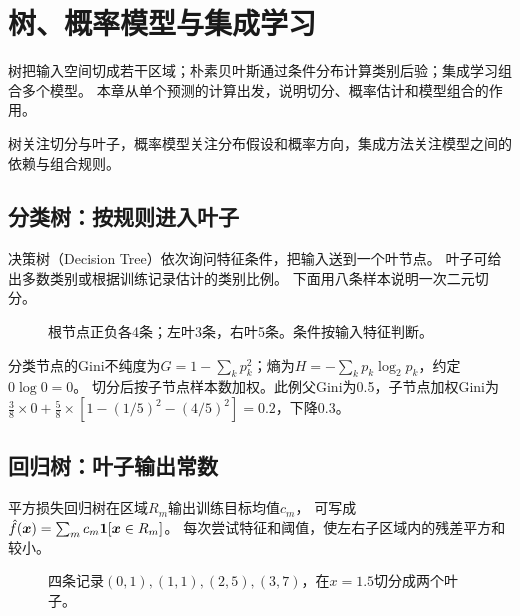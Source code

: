 \chapter{树、概率模型与集成学习}
\label{ch:trees}

树把输入空间切成若干区域；朴素贝叶斯通过条件分布计算类别后验；集成学习组合多个模型。
本章从单个预测的计算出发，说明切分、概率估计和模型组合的作用。

\begin{keyidea}[预测结构决定了检查重点]
树关注切分与叶子，概率模型关注分布假设和概率方向，集成方法关注模型之间的依赖与组合规则。
\end{keyidea}

\section{分类树：按规则进入叶子}
\label{sec:tree-classification}
决策树（Decision Tree）依次询问特征条件，把输入送到一个叶节点。
叶子可给出多数类别或根据训练记录估计的类别比例。
下面用八条样本说明一次二元切分。

\begin{figure}[htbp]
\centering
\caption{根节点正负各4条；左叶3条，右叶5条。条件按输入特征判断。}
\par\smallskip
{}
\end{figure}

分类节点的Gini不纯度为$G=1-\sum_kp_k^2$；熵为$H=-\sum_kp_k\log_2p_k$，约定$0\log0=0$。
切分后按子节点样本数加权。此例父Gini为0.5，子节点加权Gini为
$\frac38\times0+\frac58\times[1-(1/5)^2-(4/5)^2]=0.2$，下降0.3。


\section{回归树：叶子输出常数}
\label{sec:tree-regression}
平方损失回归树在区域$R_m$输出训练目标均值$c_m$，
可写成$\hat f(\boldsymbol{x})=\sum_mc_m\mathbf1[\boldsymbol{x}\in R_m]$。
每次尝试特征和阈值，使左右子区域内的残差平方和较小。

\begin{figure}[htbp]
\centering
\caption{四条记录$(0,1),(1,1),(2,5),(3,7)$，在$x=1.5$切分成两个叶子。}
\par\smallskip
{}
\end{figure}


